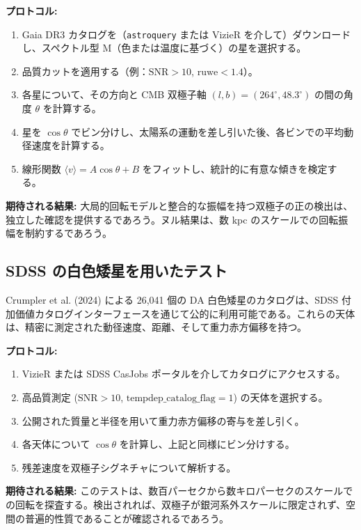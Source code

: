 \documentclass[11pt,a4paper]{article}
\begin{document}
	\textbf{プロトコル:}
	\begin{enumerate}
		\item Gaia DR3 カタログを（\texttt{astroquery} または VizieR を介して）ダウンロードし、スペクトル型 M（色または温度に基づく）の星を選択する。
		\item 品質カットを適用する（例：\(\mathrm{SNR} > 10\), \(\mathrm{ruwe} < 1.4\)）。
		\item 各星について、その方向と CMB 双極子軸 \((l,b) = (264^\circ, 48.3^\circ)\) の間の角度 \(\theta\) を計算する。
		\item 星を \(\cos\theta\) でビン分けし、太陽系の運動を差し引いた後、各ビンでの平均動径速度を計算する。
		\item 線形関数 \(\langle v \rangle = A \cos\theta + B\) をフィットし、統計的に有意な傾きを検定する。
	\end{enumerate}
	
	\textbf{期待される結果:} 大局的回転モデルと整合的な振幅を持つ双極子の正の検出は、独立した確認を提供するであろう。ヌル結果は、数 kpc のスケールでの回転振幅を制約するであろう。
	
	\subsection{SDSS の白色矮星を用いたテスト}
	
	Crumpler et al. (2024) による 26,041 個の DA 白色矮星のカタログは、SDSS 付加価値カタログインターフェースを通じて公的に利用可能である。これらの天体は、精密に測定された動径速度、距離、そして重力赤方偏移を持つ。
	
	\textbf{プロトコル:}
	\begin{enumerate}
		\item VizieR または SDSS CasJobs ポータルを介してカタログにアクセスする。
		\item 高品質測定 (\(\mathrm{SNR} > 10\), \(\mathrm{tempdep\_catalog\_flag} = 1\)) の天体を選択する。
		\item 公開された質量と半径を用いて重力赤方偏移の寄与を差し引く。
		\item 各天体について \(\cos\theta\) を計算し、上記と同様にビン分けする。
		\item 残差速度を双極子シグネチャについて解析する。
	\end{enumerate}
	
	\textbf{期待される結果:} このテストは、数百パーセクから数キロパーセクのスケールでの回転を探査する。検出されれば、双極子が銀河系外スケールに限定されず、空間の普遍的性質であることが確認されるであろう。
	
\end{document}
